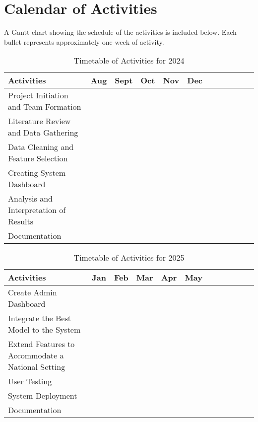 \clearpage
\section{Calendar of Activities}

A Gantt chart showing the schedule of the activities is included below. Each bullet represents approximately one week of activity.

\newcommand{\weekone}{\textbullet}
\newcommand{\weektwo}{\textbullet \textbullet}
\newcommand{\weekthree}{\textbullet \textbullet \textbullet}
\newcommand{\weekfour}{\textbullet \textbullet \textbullet \textbullet}

\begin{table}[ht]
	\centering
	\caption{Timetable of Activities for 2024} \vspace{0.25em}
	\begin{tabular}{|p{2in}|c|c|c|c|c|c|c|c|c|c|c|} \hline
		Activities & Aug & Sept & Oct & Nov & Dec \\ \hline
		Project Initiation and Team Formation & \weektwo & & & & \\ \hline
		Literature Review and Data Gathering & \weektwo & \weekfour & & & \\ \hline
		Data Cleaning and Feature Selection & & \weektwo & & \weekone & \weekone \\ \hline
		Creating System Dashboard & & \weektwo & \weekfour & \weekone & \\ \hline
		Analysis and Interpretation of Results & & & \weekone & & \weekone  \\ \hline	
		Documentation & \weektwo & \weekfour & \weekfour & \weekfour & \weekfour  \\ \hline	
	\end{tabular}
	\label{tab:timetableactivities2024}
\end{table}

\begin{table}[ht]
	\centering
	\caption{Timetable of Activities for 2025} \vspace{0.25em}
	\begin{tabular}{|p{2in}|c|c|c|c|c|c|c|c|c|c|c|} \hline
		Activities & Jan & Feb & Mar & Apr & May \\ \hline
		Create Admin Dashboard & \weekone & \weekthree & & & \\ \hline
		Integrate the Best Model to the System & \weekone & \weekfour & & & \\ \hline
		Extend Features to Accommodate a National Setting & & \weekone & \weektwo & & \\ \hline
		User Testing & & & \weektwo & \weekone & \\ \hline
		System Deployment & & & & \weekthree & \\ \hline
		Documentation & \weektwo & \weekfour & \weekfour & \weekfour & \weekfour  \\ \hline		
	\end{tabular}
	\label{tab:timetableactivities2025}
\end{table}



